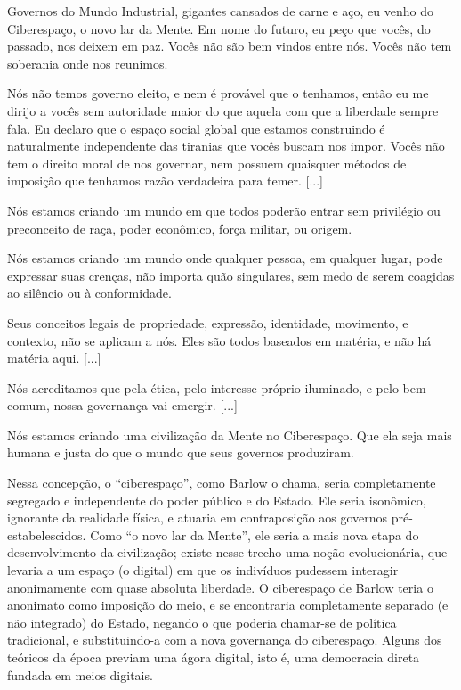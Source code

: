 \begin{citacao}
Governos do Mundo Industrial, gigantes cansados de carne e aço, eu venho do Ciberespaço, o novo lar da Mente.
Em nome do futuro, eu peço que vocês, do passado, nos deixem em paz.
Vocês não são bem vindos entre nós. Vocês não tem soberania onde nos reunimos.

Nós não temos governo eleito, e nem é provável que o tenhamos, então eu me dirijo a vocês sem autoridade maior do que aquela com que a liberdade sempre fala.
Eu declaro que o espaço social global que estamos construindo é naturalmente independente das tiranias que vocês buscam nos impor.
Vocês não tem o direito moral de nos governar, nem possuem quaisquer métodos de imposição que tenhamos razão verdadeira para temer.
[...]

Nós estamos criando um mundo em que todos poderão entrar sem privilégio ou preconceito de raça, poder econômico, força militar, ou origem.

Nós estamos criando um mundo onde qualquer pessoa, em qualquer lugar, pode expressar suas crenças, não importa quão singulares, sem medo de serem coagidas ao silêncio ou à conformidade.

Seus conceitos legais de propriedade, expressão, identidade, movimento, e contexto, não se aplicam a nós.
Eles são todos baseados em matéria, e não há matéria aqui.
[...]

Nós acreditamos que pela ética, pelo interesse próprio iluminado, e pelo bem-comum, nossa governança vai emergir.
[...]

Nós estamos criando uma civilização da Mente no Ciberespaço.
Que ela seja mais humana e justa do que o mundo que seus governos produziram.

\cite[tradução~própria]{barlow_declaration_1996}
\end{citacao}

Nessa concepção, o ``ciberespaço'', como Barlow o chama, seria completamente segregado e independente do poder público e do Estado.
Ele seria isonômico, ignorante da realidade física, e atuaria em contraposição aos governos pré-estabelescidos.
Como ``o novo lar da Mente'', ele seria a mais nova etapa do desenvolvimento da civilização; existe nesse trecho uma noção evolucionária, que levaria a um espaço (o digital) em que os indivíduos pudessem interagir anonimamente com quase absoluta liberdade.
O ciberespaço de Barlow teria o anonimato como imposição do meio, e se encontraria completamente separado (e não integrado) do Estado, negando o que poderia chamar-se de política tradicional, e substituindo-a com a nova governança do ciberespaço.
Alguns dos teóricos da época previam uma ágora digital, isto é, uma democracia direta fundada em meios digitais.


